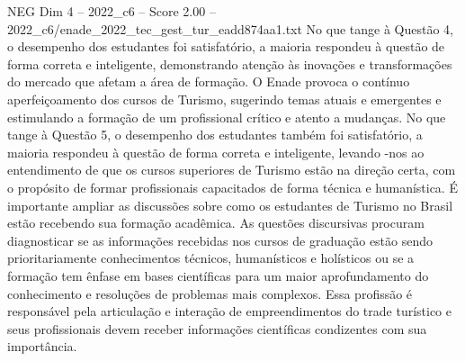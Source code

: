 \begin{textsample}{NEG Dim 4 – 2022\_c6 – Score 2.00 – 2022\_c6/enade\_2022\_tec\_gest\_tur\_eadd874aa1.txt}
No que tange à Questão 4, o desempenho dos estudantes foi satisfatório, a maioria respondeu à questão de forma correta e inteligente, demonstrando atenção às inovações e transformações do mercado que afetam a área de formação.
O Enade provoca o contínuo aperfeiçoamento dos cursos de Turismo, sugerindo temas atuais e emergentes e estimulando a formação de um profissional crítico e atento a mudanças.
No que tange à Questão 5, o desempenho dos estudantes também foi satisfatório, a maioria respondeu à questão de forma correta e inteligente, levando -nos ao entendimento de que os cursos superiores de Turismo estão na direção certa, com o propósito de formar profissionais capacitados de forma técnica e humanística.
É importante ampliar as discussões sobre como os estudantes de Turismo no Brasil estão recebendo sua formação acadêmica.
As questões discursivas procuram diagnosticar se as informações recebidas nos cursos de graduação estão sendo prioritariamente conhecimentos técnicos, humanísticos e holísticos ou se a formação tem ênfase em bases científicas para um maior aprofundamento do conhecimento e resoluções de problemas mais complexos.
Essa profissão é responsável pela articulação e interação de empreendimentos do trade turístico e seus profissionais devem receber informações científicas condizentes com sua importância.

\end{textsample}
